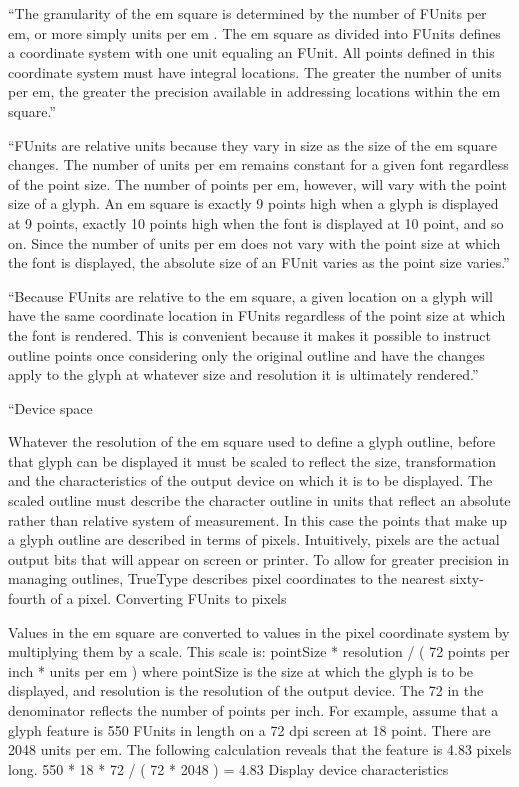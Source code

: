 \documentclass[12pt]{tufte-handout}
\numberwithin{equation}{subsection}
\numberwithin{equation}{subsection}
\begin{document}
\begin{appendices}
``The granularity of the em square is determined by the number of FUnits per em, or more simply units per em . The em square as divided into FUnits defines a coordinate system with one unit equaling an FUnit. All points defined in this coordinate system must have integral locations. The greater the number of units per em, the greater the precision available in addressing locations within the em square.''

``FUnits are relative units because they vary in size as the size of the em square changes. The number of units per em remains constant for a given font regardless of the point size. The number of points per em, however, will vary with the point size of a glyph. An em square is exactly 9 points high when a glyph is displayed at 9 points, exactly 10 points high when the font is displayed at 10 point, and so on. Since the number of units per em does not vary with the point size at which the font is displayed, the absolute size of an FUnit varies as the point size varies.''

``Because FUnits are relative to the em square, a given location on a glyph will have the same coordinate location in FUnits regardless of the point size at which the font is rendered. This is convenient because it makes it possible to instruct outline points once considering only the original outline and have the changes apply to the glyph at whatever size and resolution it is ultimately rendered.''

``Device space

Whatever the resolution of the em square used to define a glyph outline, before that glyph can be displayed it must be scaled to reflect the size, transformation and the characteristics of the output device on which it is to be displayed. The scaled outline must describe the character outline in units that reflect an absolute rather than relative system of measurement. In this case the points that make up a glyph outline are described in terms of pixels.
Intuitively, pixels are the actual output bits that will appear on screen or printer. To allow for greater precision in managing outlines, TrueType describes pixel coordinates to the nearest sixty-fourth of a pixel.
Converting FUnits to pixels

Values in the em square are converted to values in the pixel coordinate system by multiplying them by a scale. This scale is:
pointSize * resolution / ( 72 points per inch * units per em )
where pointSize is the size at which the glyph is to be displayed, and resolution is the resolution of the output device. The 72 in the denominator reflects the number of points per inch.
For example, assume that a glyph feature is 550 FUnits in length on a 72 dpi screen at 18 point. There are 2048 units per em. The following calculation reveals that the feature is 4.83 pixels long.
550 * 18 * 72 / ( 72 * 2048 ) = 4.83
Display device characteristics


\end{appendices}
\end{document}
